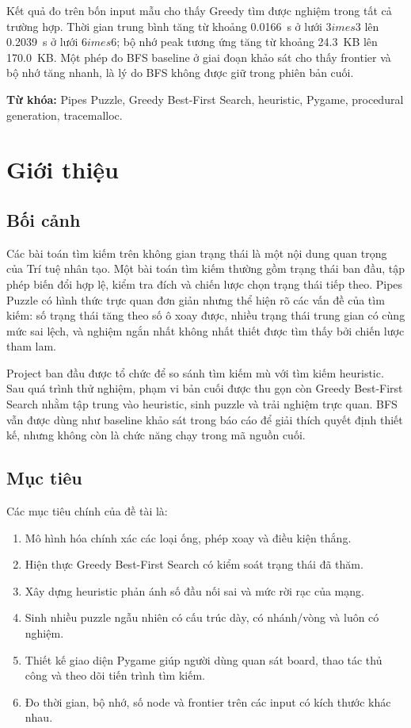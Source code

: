 \documentclass[12pt,a4paper]{article}
\begin{document}
Kết quả đo trên bốn input mẫu cho thấy Greedy tìm được nghiệm trong tất cả trường hợp. Thời gian trung bình tăng từ khoảng \SI{0.0166}{s} ở lưới 3\(	imes\)3 lên \SI{0.2039}{s} ở lưới 6\(	imes\)6; bộ nhớ peak tương ứng tăng từ khoảng \SI{24.3}{KB} lên \SI{170.0}{KB}. Một phép đo BFS baseline ở giai đoạn khảo sát cho thấy frontier và bộ nhớ tăng nhanh, là lý do BFS không được giữ trong phiên bản cuối.

\textbf{Từ khóa:} Pipes Puzzle, Greedy Best-First Search, heuristic, Pygame, procedural generation, tracemalloc.

\tableofcontents
\listoftables
\clearpage
{}

\section{Giới thiệu}
\subsection{Bối cảnh}
Các bài toán tìm kiếm trên không gian trạng thái là một nội dung quan trọng của Trí tuệ nhân tạo. Một bài toán tìm kiếm thường gồm trạng thái ban đầu, tập phép biến đổi hợp lệ, kiểm tra đích và chiến lược chọn trạng thái tiếp theo. Pipes Puzzle có hình thức trực quan đơn giản nhưng thể hiện rõ các vấn đề của tìm kiếm: số trạng thái tăng theo số ô xoay được, nhiều trạng thái trung gian có cùng mức sai lệch, và nghiệm ngắn nhất không nhất thiết được tìm thấy bởi chiến lược tham lam.

Project ban đầu được tổ chức để so sánh tìm kiếm mù với tìm kiếm heuristic. Sau quá trình thử nghiệm, phạm vi bản cuối được thu gọn còn Greedy Best-First Search nhằm tập trung vào heuristic, sinh puzzle và trải nghiệm trực quan. BFS vẫn được dùng như baseline khảo sát trong báo cáo để giải thích quyết định thiết kế, nhưng không còn là chức năng chạy trong mã nguồn cuối.

\subsection{Mục tiêu}
Các mục tiêu chính của đề tài là:
\begin{enumerate}[label=\arabic*.]
  \item Mô hình hóa chính xác các loại ống, phép xoay và điều kiện thắng.
  \item Hiện thực Greedy Best-First Search có kiểm soát trạng thái đã thăm.
  \item Xây dựng heuristic phản ánh số đầu nối sai và mức rời rạc của mạng.
  \item Sinh nhiều puzzle ngẫu nhiên có cấu trúc dày, có nhánh/vòng và luôn có nghiệm.
  \item Thiết kế giao diện Pygame giúp người dùng quan sát board, thao tác thủ công và theo dõi tiến trình tìm kiếm.
  \item Đo thời gian, bộ nhớ, số node và frontier trên các input có kích thước khác nhau.
\end{enumerate}
\end{document}
